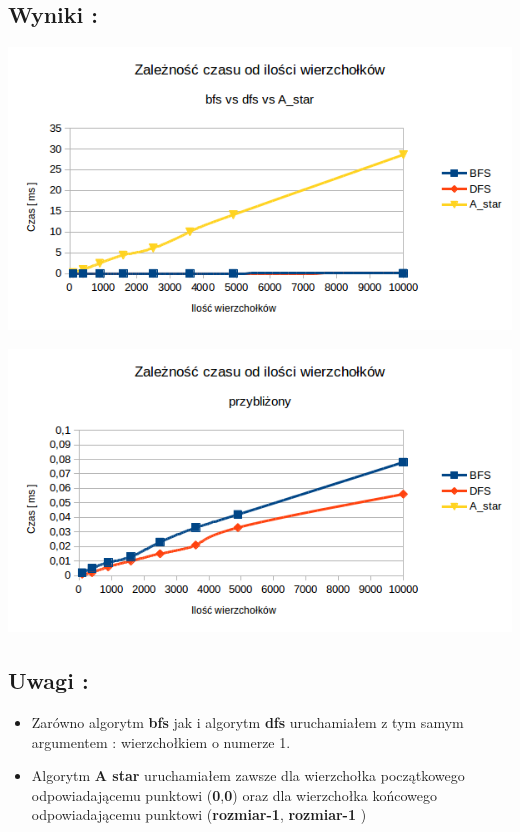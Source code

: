 \documentclass[10 pt]{article}
\begin{document}
\subsection{Wyniki : }
\begin{center}
\includegraphics[scale=0.7]{wykres.png}
\end{center}
\begin{center}
\includegraphics[scale=0.7]{wykres_przyblirzony.png}
\end{center}
\subsection{Uwagi :}
\begin{itemize}
\item Zarówno algorytm \textbf{bfs} jak i algorytm \textbf{dfs} uruchamiałem z tym samym argumentem : wierzchołkiem o numerze 1.
\item Algorytm \textbf{A star} uruchamiałem zawsze dla wierzchołka początkowego odpowiadającemu punktowi (\textbf{0},\textbf{0}) oraz dla wierzchołka końcowego odpowiadającemu punktowi (\textbf{rozmiar-1}, \textbf{rozmiar-1} )
\end{itemize}
\end{document}
